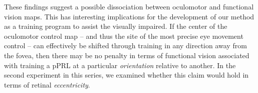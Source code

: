These findings suggest a possible dissociation between oculomotor and functional vision maps. This has interesting implications for the development of our method as a training program to assist the visually impaired. If the center of the oculomotor control map -- and thus the site of the most precise eye movement control -- can effectively be shifted through training in any direction away from the fovea, then there may be no penalty in terms of functional vision associated with training a pPRL at a particular \textit{orientation} relative to another. In the second experiment in this series, we examined whether this claim would hold in terms of retinal \textit{eccentricity}.
